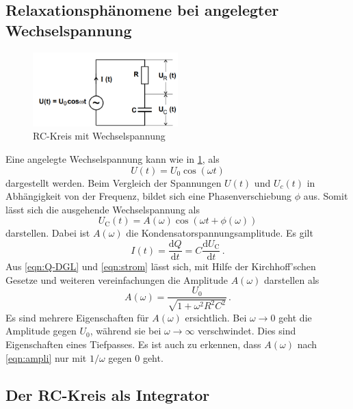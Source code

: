 \subsection{Relaxationsphänomene bei angelegter Wechselspannung}
\begin{figure}
    \centering
    \caption{RC-Kreis mit Wechselspannung} 
    \label{fig:Wechs}
    \includegraphics[width = 0.5\textwidth]{pics/wechselspannung-RC.png}
\end{figure}
Eine angelegte Wechselspannung kann wie in \ref{fig:Wechs}, als 
\begin{equation*}
    U(t)=U_0 \cos(\omega t)
\end{equation*}
dargestellt werden. Beim Vergleich der Spannungen $U(t)$ und $U_c(t)$ in Abhängigkeit von der Frequenz, bildet sich eine Phasenverschiebung $\phi$ aus.
Somit lässt sich die ausgehende Wechselspannung als
\begin{equation}
    U_\text{C}(t)= A(\omega) \cos (\omega t + \phi (\omega))
\end{equation}
darstellen. Dabei ist $A(\omega)$ die Kondensatorspannungsamplitude.
Es gilt 
\begin{equation}
    \label{eqn:strom}
    I(t)= \frac{\text{d}Q}{\text{d}t}=C \frac{\text{d}U_\text{C}}{\text{d}t}\, .
\end{equation}
Aus \eqref{eqn:Q-DGL} und \eqref{eqn:strom} lässt sich, mit Hilfe der Kirchhoff'schen Gesetze 
und weiteren vereinfachungen die Amplitude $A(\omega)$ darstellen als
\begin{equation}
    \label{eqn:ampli}
    A(\omega)=\frac{U_0}{\sqrt{1+\omega^2 R^2 C^2}} \, .
\end{equation}
Es sind mehrere Eigenschaften für $A(\omega)$ ersichtlich. Bei $\omega \rightarrow 0$ geht die Amplitude gegen $U_0$, während sie bei 
$\omega \rightarrow \infty$ verschwindet. Dies sind Eigenschaften eines Tiefpasses. Es ist auch zu erkennen, dass $A(\omega)$ nach \eqref{eqn:ampli}
nur mit $1/\omega$ gegen $0$ geht.
\subsection{Der RC-Kreis als Integrator}